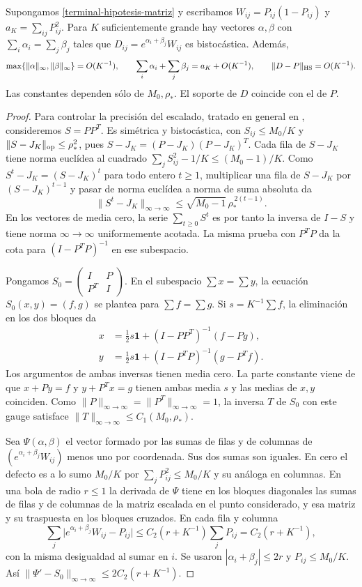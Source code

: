 \begin{lema}\label{terminal-escalado}
Supongamos \eqref{terminal-hipotesis-matriz} y escribamos
$W_{ij}=P_{ij}(1-P_{ij})$ y $a_K=\sum_{ij}P_{ij}^2$. Para $K$ suficientemente grande hay vectores
$\alpha,\beta$ con $\sum_i\alpha_i=\sum_j\beta_j$ tales que $D_{ij}=e^{\alpha_i+\beta_j}W_{ij}$ es
bistocástica. Además,
\[
 \max\{\|\alpha\|_\infty,\|\beta\|_\infty\}=O(K^{-1}),\qquad
 \sum_i\alpha_i+\sum_j\beta_j=a_K+O(K^{-1}),\qquad
 \|D-P\|_{\rm HS}=O(K^{-1}).
\]
Las constantes dependen sólo de $M_0,\rho_*$. El soporte de $D$ coincide con el de $P$.
\end{lema}
\begin{proof}
Para controlar la precisión del escalado, tratado en general en \cite{sk}, consideremos $S=PP^T$. Es
simétrica y bistocástica, con $S_{ij}\le M_0/K$ y $\|S-J_K\|_{\rm op}\le\rho_*^2$, pues
$S-J_K=(P-J_K)(P-J_K)^T$. Cada fila de $S-J_K$ tiene norma euclídea al cuadrado
$\sum_j S_{ij}^2-1/K\le (M_0-1)/K$. Como $S^t-J_K=(S-J_K)^t$ para todo entero $t\ge1$, multiplicar una
fila de $S-J_K$ por $(S-J_K)^{t-1}$ y pasar de norma euclídea a norma de suma absoluta da
\[
 \|S^t-J_K\|_{\infty\to\infty}
 \le \sqrt{M_0-1}\,\rho_*^{\,2(t-1)} .
\]
En los vectores de media cero, la serie $\sum_{t\ge0}S^t$ es por tanto la inversa de $I-S$ y tiene
norma $\infty\to\infty$ uniformemente acotada. La misma prueba con $P^TP$ da la cota para
$(I-P^TP)^{-1}$ en ese subespacio.

Pongamos $S_0=\left(\begin{smallmatrix}I&P\\P^T&I\end{smallmatrix}\right)$.
En el subespacio $\sum x=\sum y$, la ecuación $S_0(x,y)=(f,g)$ se plantea para $\sum f=\sum g$. Si
$s=K^{-1}\sum f$, la eliminación en los dos bloques da
\[
 \begin{aligned}
 x&=\tfrac12s\mathbf1+(I-PP^T)^{-1}(f-Pg),\\
 y&=\tfrac12s\mathbf1+(I-P^TP)^{-1}(g-P^Tf).
 \end{aligned}
\]
Los argumentos de ambas inversas tienen media cero. La parte constante viene de que $x+Py=f$ y
$y+P^Tx=g$ tienen ambas media $s$ y las medias de $x,y$ coinciden. Como
$\|P\|_{\infty\to\infty}=\|P^T\|_{\infty\to\infty}=1$, la inversa $T$ de $S_0$ con este gauge
satisface $\|T\|_{\infty\to\infty}\le C_1(M_0,\rho_*)$.

Sea $\Psi(\alpha,\beta)$ el vector formado por las sumas de filas y de columnas de
$(e^{\alpha_i+\beta_j}W_{ij})$ menos
uno por coordenada. Sus dos sumas son iguales. En cero el defecto es a lo sumo $M_0/K$ por
$\sum_jP_{ij}^2\le M_0/K$ y su análoga en columnas. En una bola de radio $r\le1$ la derivada de $\Psi$
tiene en los bloques diagonales las sumas de filas y de columnas de la matriz escalada en el punto
considerado, y esa matriz y su traspuesta en los bloques cruzados. En cada fila y columna
\[
 \sum_j\big|e^{\alpha_i+\beta_j}W_{ij}-P_{ij}\big|
 \le C_2(r+K^{-1})\sum_jP_{ij}=C_2(r+K^{-1}),
\]
con la misma desigualdad al sumar en $i$. Se usaron $|\alpha_i+\beta_j|\le2r$ y $P_{ij}\le M_0/K$. Así
$\|\Psi'-S_0\|_{\infty\to\infty}\le 2C_2(r+K^{-1})$.


\end{proof}
